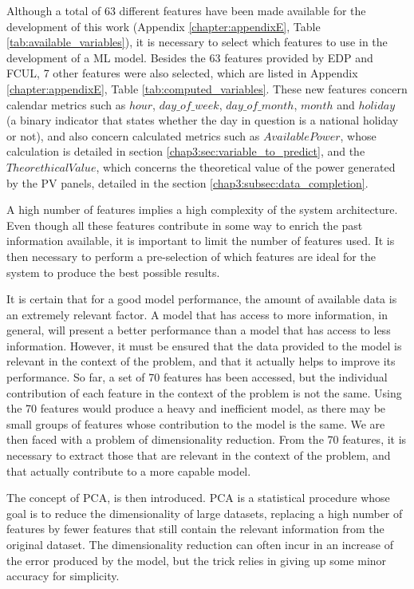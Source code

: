 Although a total of 63 different features have been made available for the development of this work (Appendix \ref{chapter:appendixE}, Table \ref{tab:available_variables}), it is necessary to select which features to use in the development of a \ac{ML} model. Besides the 63 features provided by \ac{EDP} and \ac{FCUL}, 7 other features were also selected, which are listed in Appendix \ref{chapter:appendixE}, Table \ref{tab:computed_variables}. These new features concern calendar metrics such as $hour$, $day\_of\_week$, $day\_of\_month$, $month$ and $holiday$ (a binary indicator that states whether the day in question is a national holiday or not), and also concern calculated metrics such as $AvailablePower$, whose calculation is detailed in section \ref{chap3:sec:variable_to_predict}, and the $TheorethicalValue$, which concerns the theoretical value of the power generated by the \ac{PV} panels, detailed in the section \ref{chap3:subsec:data_completion}. 

A high number of features implies a high complexity of the system architecture. Even though all these features contribute in some way to enrich the past information available, it is important to limit the number of features used. It is then necessary to perform a pre-selection of which features are ideal for the system to produce the best possible results. 

It is certain that for a good model performance, the amount of available data is an extremely relevant factor. A model that has access to more information, in general, will present a better performance than a model that has access to less information. However, it must be ensured that the data provided to the model is relevant in the context of the problem, and that it actually helps to improve its performance. So far, a set of 70 features has been accessed, but the individual contribution of each feature in the context of the problem is not the same. Using the 70 features would produce a heavy and inefficient model, as there may be small groups of features whose contribution to the model is the same. We are then faced with a problem of dimensionality reduction. From the 70 features, it is necessary to extract those that are relevant in the context of the problem, and that actually contribute to a more capable model.

The concept of \ac{PCA}, \cite{pca} is then introduced. \ac{PCA} is a statistical procedure whose goal is to reduce the dimensionality of large datasets, replacing a high number of features by fewer features that still contain the relevant information from the original dataset. The dimensionality reduction can often incur in an increase of the error produced by the model, but the trick relies in giving up some minor accuracy for simplicity.



